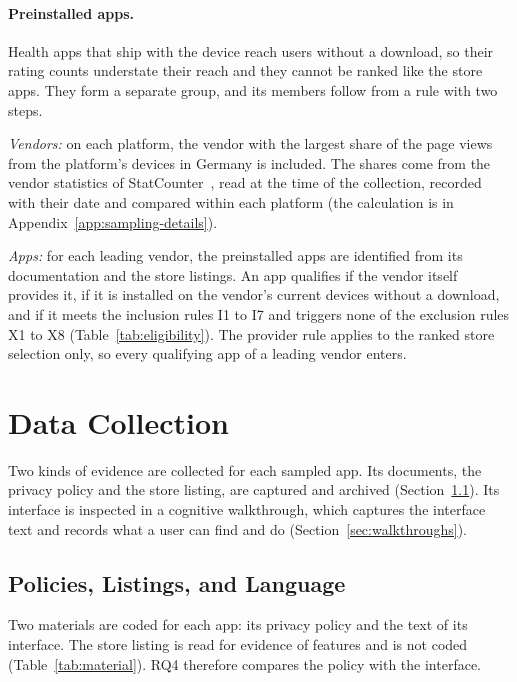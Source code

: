 \paragraph{Preinstalled apps.} Health apps that ship with the device reach
users without a download, so their rating counts understate their reach and
they cannot be ranked like the store apps. They form a separate group, and
its members follow from a rule with two steps.

\emph{Vendors:} on each platform, the vendor with the largest share of the
page views from the platform's devices in Germany is included. The shares come from the
vendor statistics of StatCounter~\parencite{statcounter2026vendor}, read at the
time of the collection, recorded with their date and compared within each platform
(the calculation is in Appendix~\ref{app:sampling-details}).

\emph{Apps:} for each leading vendor, the preinstalled apps are identified from
its documentation and the store listings. An app qualifies if the vendor itself
provides it, if it is installed on the vendor's current devices without a
download, and if it meets the inclusion rules I1 to I7 and triggers none of the exclusion rules
X1 to X8 (Table~\ref{tab:eligibility}). The provider rule applies to the
ranked store selection only, so every qualifying app of a leading vendor enters.

\section{Data Collection}
\label{sec:collection}
Two kinds of evidence are collected for each sampled app. Its documents, the privacy policy and
the store listing, are captured and archived (Section~\ref{sec:material}). Its interface is
inspected in a cognitive walkthrough, which captures the interface text and records what a user
can find and do (Section~\ref{sec:walkthroughs}).

\subsection{Policies, Listings, and Language}
\label{sec:material}
Two materials are coded for each app: its privacy policy and the text of its
interface. The store listing is read for evidence of features and is not coded
(Table~\ref{tab:material}). RQ4 therefore compares the policy with the interface.

